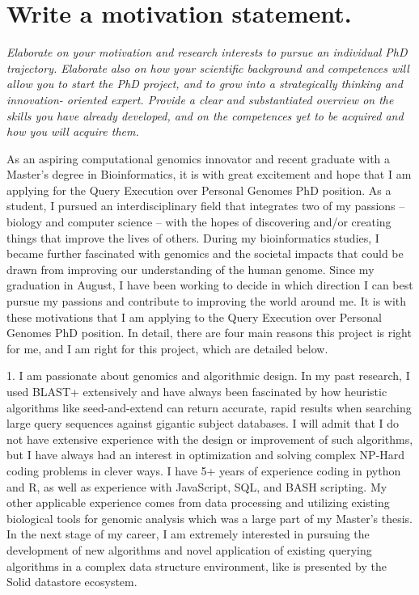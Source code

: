 {\section{Write a motivation statement.}
\textit{
Elaborate on your motivation and research interests to pursue an individual PhD trajectory. 
Elaborate also on how your scientific background and competences will allow you to start the PhD project, and to grow into a strategically thinking and innovation- oriented expert. 
Provide a clear and substantiated overview on the skills you have already developed, and on the competences yet to be acquired and how you will acquire them.
}

As an aspiring computational genomics innovator and recent graduate with a Master’s degree in Bioinformatics, it is with great excitement and hope that I am applying for the Query Execution over Personal Genomes PhD position. 
As a student, I pursued an interdisciplinary field that integrates two of my passions – biology and computer science – with the hopes of discovering and/or creating things that improve the lives of others. 
During my bioinformatics studies, I became further fascinated with genomics and the societal impacts that could be drawn from improving our understanding of the human genome. 
Since my graduation in August, I have been working to decide in which direction I can best pursue my passions and contribute to improving the world around me. 
It is with these motivations that I am applying to the Query Execution over Personal Genomes PhD position. 
In detail, there are four main reasons this project is right for me, and I am right for this project, which are detailed below.

1. I am passionate about genomics and algorithmic design. 
In my past research, I used BLAST+ extensively and have always been fascinated by how heuristic algorithms like seed-and-extend can return accurate, rapid results when searching large query sequences against gigantic subject databases. 
I will admit that I do not have extensive experience with the design or improvement of such algorithms, but I have always had an interest in optimization and solving complex NP-Hard coding problems in clever ways. 
I have 5+ years of experience coding in python and R, as well as experience with JavaScript, SQL, and BASH scripting. 
My other applicable experience comes from data processing and utilizing existing biological tools for genomic analysis which was a large part of my Master’s thesis. 
In the next stage of my career, I am extremely interested in pursuing the development of new algorithms and novel application of existing querying algorithms in a complex data structure environment, like is presented by the Solid datastore ecosystem.

}
